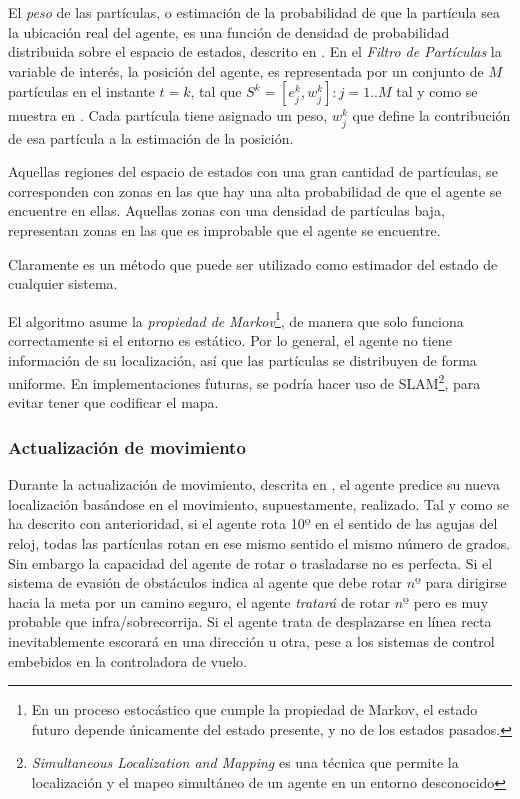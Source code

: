 El \textit{peso} de las partículas, o estimación de la probabilidad de que la partícula sea la ubicación real del agente, es una función de densidad de probabilidad distribuida sobre el espacio de estados, descrito en \citep{wiki:RLtPF}. 
En el \emph{Filtro de Partículas} la variable de interés, la posición del agente, es representada por un conjunto de $M$ partículas en el instante $t = k$, tal que $S^k=[e_j^k,w_j^k]:j=1..M$ tal y como se muestra en \citep{art:PFTuto}. Cada partícula tiene asignado un peso, $w_j^k$ que define la contribución de esa partícula a la estimación de la posición.

Aquellas regiones del espacio de estados con una gran cantidad de partículas, se corresponden con zonas en las que hay una alta probabilidad de que el agente se encuentre en ellas. Aquellas zonas con una densidad de partículas baja, representan zonas en las que es improbable que el agente se encuentre.

Claramente es un método que puede ser utilizado como estimador del estado de cualquier sistema.

El algoritmo asume la \textit{propiedad de Markov}\footnote{En un proceso estocástico que cumple la propiedad de Markov, el estado futuro depende únicamente del estado presente, y no de los estados pasados.}, de manera que solo funciona correctamente si el entorno es estático. Por lo general, el agente no tiene información de su localización, así que las partículas se distribuyen de forma uniforme. En implementaciones futuras, se podría hacer uso de SLAM\footnote{\emph{Simultaneous Localization and Mapping} es una técnica que permite la localización y el mapeo simultáneo de un agente en un entorno desconocido}, para evitar tener que codificar el mapa.

\subsubsection{Actualización de movimiento}
Durante la actualización de movimiento, descrita en \citep{art:PFTuto, art:PFBL}, el agente predice su nueva localización basándose en el movimiento, supuestamente, realizado. Tal y como se ha descrito con anterioridad, si el agente rota 10º en el sentido de las agujas del reloj, todas las partículas rotan en ese mismo sentido el mismo número de grados. 
Sin embargo la capacidad del agente de rotar o trasladarse no es perfecta. Si el sistema de evasión de obstáculos indica al agente que debe rotar $nº$ para dirigirse hacia la meta por un camino seguro, el agente \emph{tratará} de rotar $nº$ pero es muy probable que infra/sobrecorrija.
Si el agente trata de desplazarse en línea recta inevitablemente escorará en una dirección u otra, pese a los sistemas de control embebidos en la controladora de vuelo. 


